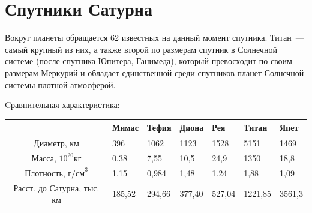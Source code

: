 \documentclass{article}
\begin{document}
    \section{Спутники Сатурна}
    Вокруг планеты обращается 62 известных на данный момент спутника. Титан~— самый крупный из них, а также второй по размерам спутник в Солнечной системе (после спутника Юпитера, Ганимеда), который превосходит по своим размерам Меркурий и обладает единственной среди спутников планет Солнечной системы плотной атмосферой. \par
    Cравнительная характеристика: \par
    \begin{tabularx}{0.9\textwidth}{|C{0.16}|I{0.12}|I{0.12}|I{0.12}|I{0.12}|I{0.12}|I{0.12}|}
    \hline
     & Мимас & Тефия & Диона & Рея & Титан & Япет \\
	\hline
	Диаметр, км & 396 & 1062 & 1123 & 1528 & 5151 & 1469 \\
	\hline
	Масса, $10^{20} \text{кг}$ & 0,38 & 7,55 & 10,5 & 24,9 & 1350 & 18,8 \\
	\hline
	Плотность, $\text{г/см}^3$ & 1,15 & 0,984 & 1,48 & 1.24 & 1,88 & 1,09 \\
	\hline
	Расст. до Сатурна, тыс. км & 185,52 & 294,66 & 377,40 & 527,04 & 1221,85 & 3561,3 \\
	\hline
    \end{tabularx}
\end{document}
